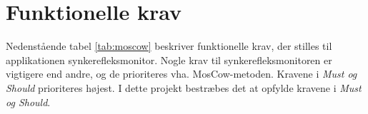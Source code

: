 \pagebreak
\section{Funktionelle krav}

Nedenstående tabel \ref{tab:moscow} beskriver funktionelle krav, der stilles til applikationen synkerefleksmonitor. Nogle krav til synkerefleksmonitoren er vigtigere end andre, og de prioriteres vha. MosCow-metoden. Kravene i\textit{ Must og Should} prioriteres højest. I dette projekt bestræbes det at opfylde kravene i \textit{ Must og Should}. \\






%
%
%
%
%

